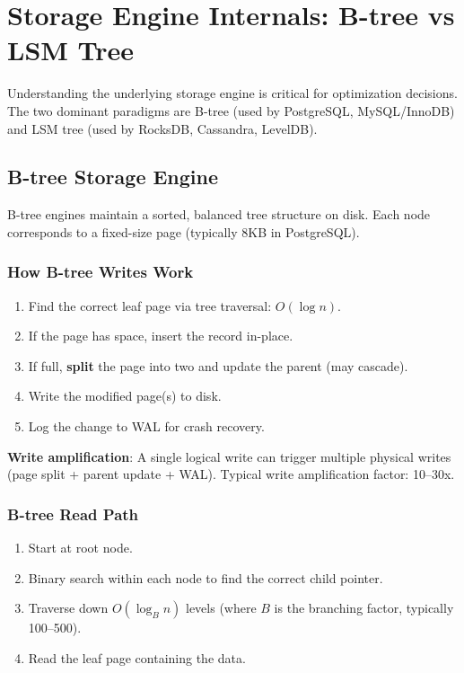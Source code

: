 \documentclass[12pt,a4paper]{article}
\begin{document}
\section{Storage Engine Internals: B-tree vs LSM Tree}

Understanding the underlying storage engine is critical for optimization decisions. The two dominant paradigms are B-tree (used by PostgreSQL, MySQL/InnoDB) and LSM tree (used by RocksDB, Cassandra, LevelDB).

\subsection{B-tree Storage Engine}

B-tree engines maintain a sorted, balanced tree structure on disk. Each node corresponds to a fixed-size page (typically 8KB in PostgreSQL).

\subsubsection{How B-tree Writes Work}

\begin{enumerate}
    \item Find the correct leaf page via tree traversal: $O(\log n)$.
    \item If the page has space, insert the record in-place.
    \item If full, \textbf{split} the page into two and update the parent (may cascade).
    \item Write the modified page(s) to disk.
    \item Log the change to WAL for crash recovery.
\end{enumerate}

\textbf{Write amplification}: A single logical write can trigger multiple physical writes (page split + parent update + WAL). Typical write amplification factor: 10--30x.

\subsubsection{B-tree Read Path}

\begin{enumerate}
    \item Start at root node.
    \item Binary search within each node to find the correct child pointer.
    \item Traverse down $O(\log_B n)$ levels (where $B$ is the branching factor, typically 100--500).
    \item Read the leaf page containing the data.
\end{enumerate}
\end{document}
